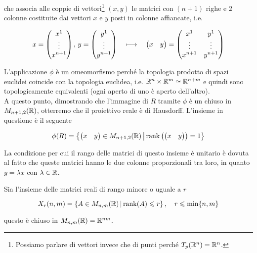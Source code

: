 che associa alle coppie di vettori\footnote{%
	Possiamo parlare di vettori invece che di punti perché $ T_{p}(\mathbb{R}^{n}) = \mathbb{R}^{n} $.%
} $ (x,y) $ le matrici con $ (n+1) $ righe e $ 2 $ colonne costituite dai vettori $ x $ e $ y $ posti in colonne affiancate, i.e.

\begin{equation}
	x = \pmqty{x^{1} \\ \vdots \\ x^{n+1}} , \, y = \pmqty{y^{1} \\ \vdots \\ y^{n+1}} %
	\quad \longmapsto \quad%
	\pmqty{x & y} = \pmqty{x^{1} & y^{1} \\ \vdots & \vdots \\ x^{n+1} & y^{n+1}}
\end{equation}

L'applicazione $ \phi $ è un omeomorfismo perché la topologia prodotto di spazi euclidei coincide con la topologia euclidea, i.e. $ \mathbb{R}^{n} \times \mathbb{R}^{m} \simeq \mathbb{R}^{n+m} $ e quindi sono topologicamente equivalenti (ogni aperto di uno è aperto dell'altro).\\
A questo punto, dimostrando che l'immagine di $ R $ tramite $ \phi $ è un chiuso in $ M_{n+1,2}(\mathbb{R}) $, otterremo che il proiettivo reale è di Hausdorff. L'insieme in questione è il seguente

\begin{equation}
	\phi(R) = \left\{ \pmqty{x & y} \in M_{n+1,2}(\R) \st \rank \left( \pmqty{x & y} \right) = 1 \right\}
\end{equation}

La condizione per cui il rango delle matrici di questo insieme è unitario è dovuta al fatto che queste matrici hanno le due colonne proporzionali tra loro, in quanto $ y= \lambda x $ con $ \lambda \in \mathbb{R} $.

\begin{lemma}\label{lemma-clos-matrix}
	Sia l'insieme delle matrici reali di rango minore o uguale a $ r $
	
	\begin{equation}
		X_{r}(n,m) = \left\{ A \in M_{n,m}(\R) \st \rank(A) \leqslant r \right\} %
		\qcomma r \leqslant \min\{n,m\}
	\end{equation}

	questo è chiuso in $ M_{n,m}(\mathbb{R}) = \mathbb{R}^{n m} $.
\end{lemma}

